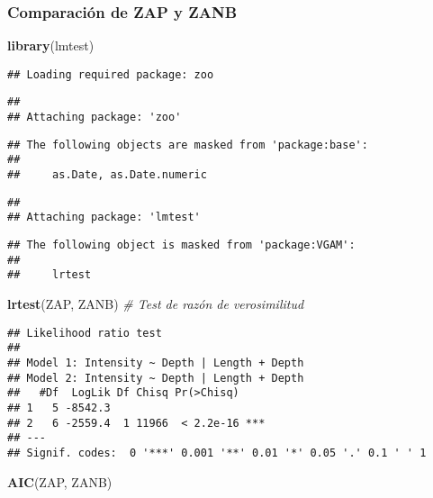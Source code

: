 \documentclass[
]{book}
\newenvironment{Shaded}{\begin{snugshade}}{\end{snugshade}}
\newcommand{\CommentTok}[1]{\textcolor[rgb]{0.56,0.35,0.01}{\textit{#1}}}
\newcommand{\KeywordTok}[1]{\textcolor[rgb]{0.13,0.29,0.53}{\textbf{#1}}}
\newcommand{\NormalTok}[1]{#1}
\begin{document}
\hypertarget{comparaciuxf3n-de-zap-y-zanb}{%
\subsubsection{Comparación de ZAP y ZANB}\label{comparaciuxf3n-de-zap-y-zanb}}

\begin{Shaded}
\begin{Highlighting}[]
\KeywordTok{library}\NormalTok{(lmtest)}
\end{Highlighting}
\end{Shaded}

\begin{verbatim}
## Loading required package: zoo
\end{verbatim}

\begin{verbatim}
## 
## Attaching package: 'zoo'
\end{verbatim}

\begin{verbatim}
## The following objects are masked from 'package:base':
## 
##     as.Date, as.Date.numeric
\end{verbatim}

\begin{verbatim}
## 
## Attaching package: 'lmtest'
\end{verbatim}

\begin{verbatim}
## The following object is masked from 'package:VGAM':
## 
##     lrtest
\end{verbatim}

\begin{Shaded}
\begin{Highlighting}[]
\KeywordTok{lrtest}\NormalTok{(ZAP, ZANB) }\CommentTok{# Test de razón de verosimilitud}
\end{Highlighting}
\end{Shaded}

\begin{verbatim}
## Likelihood ratio test
## 
## Model 1: Intensity ~ Depth | Length + Depth
## Model 2: Intensity ~ Depth | Length + Depth
##   #Df  LogLik Df Chisq Pr(>Chisq)    
## 1   5 -8542.3                        
## 2   6 -2559.4  1 11966  < 2.2e-16 ***
## ---
## Signif. codes:  0 '***' 0.001 '**' 0.01 '*' 0.05 '.' 0.1 ' ' 1
\end{verbatim}

\begin{Shaded}
\begin{Highlighting}[]
\KeywordTok{AIC}\NormalTok{(ZAP, ZANB)}
\end{Highlighting}
\end{Shaded}
\end{document}
